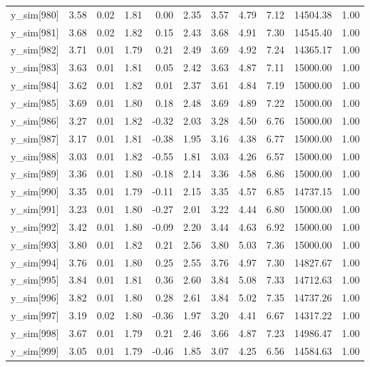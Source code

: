 \begin{table}[ht]
\begin{tabular}{rrrrrrrrrrr}
  y\_sim[980] & 3.58 & 0.02 & 1.81 & 0.00 & 2.35 & 3.57 & 4.79 & 7.12 & 14504.38 & 1.00 \\ 
  y\_sim[981] & 3.68 & 0.02 & 1.82 & 0.15 & 2.43 & 3.68 & 4.91 & 7.30 & 14545.40 & 1.00 \\ 
  y\_sim[982] & 3.71 & 0.01 & 1.79 & 0.21 & 2.49 & 3.69 & 4.92 & 7.24 & 14365.17 & 1.00 \\ 
  y\_sim[983] & 3.63 & 0.01 & 1.81 & 0.05 & 2.42 & 3.63 & 4.87 & 7.11 & 15000.00 & 1.00 \\ 
  y\_sim[984] & 3.62 & 0.01 & 1.82 & 0.01 & 2.37 & 3.61 & 4.84 & 7.19 & 15000.00 & 1.00 \\ 
  y\_sim[985] & 3.69 & 0.01 & 1.80 & 0.18 & 2.48 & 3.69 & 4.89 & 7.22 & 15000.00 & 1.00 \\ 
  y\_sim[986] & 3.27 & 0.01 & 1.82 & -0.32 & 2.03 & 3.28 & 4.50 & 6.76 & 15000.00 & 1.00 \\ 
  y\_sim[987] & 3.17 & 0.01 & 1.81 & -0.38 & 1.95 & 3.16 & 4.38 & 6.77 & 15000.00 & 1.00 \\ 
  y\_sim[988] & 3.03 & 0.01 & 1.82 & -0.55 & 1.81 & 3.03 & 4.26 & 6.57 & 15000.00 & 1.00 \\ 
  y\_sim[989] & 3.36 & 0.01 & 1.80 & -0.18 & 2.14 & 3.36 & 4.58 & 6.86 & 15000.00 & 1.00 \\ 
  y\_sim[990] & 3.35 & 0.01 & 1.79 & -0.11 & 2.15 & 3.35 & 4.57 & 6.85 & 14737.15 & 1.00 \\ 
  y\_sim[991] & 3.23 & 0.01 & 1.80 & -0.27 & 2.01 & 3.22 & 4.44 & 6.80 & 15000.00 & 1.00 \\ 
  y\_sim[992] & 3.42 & 0.01 & 1.80 & -0.09 & 2.20 & 3.44 & 4.63 & 6.92 & 15000.00 & 1.00 \\ 
  y\_sim[993] & 3.80 & 0.01 & 1.82 & 0.21 & 2.56 & 3.80 & 5.03 & 7.36 & 15000.00 & 1.00 \\ 
  y\_sim[994] & 3.76 & 0.01 & 1.80 & 0.25 & 2.55 & 3.76 & 4.97 & 7.30 & 14827.67 & 1.00 \\ 
  y\_sim[995] & 3.84 & 0.01 & 1.81 & 0.36 & 2.60 & 3.84 & 5.08 & 7.33 & 14712.63 & 1.00 \\ 
  y\_sim[996] & 3.82 & 0.01 & 1.80 & 0.28 & 2.61 & 3.84 & 5.02 & 7.35 & 14737.26 & 1.00 \\ 
  y\_sim[997] & 3.19 & 0.02 & 1.80 & -0.36 & 1.97 & 3.20 & 4.41 & 6.67 & 14317.22 & 1.00 \\ 
  y\_sim[998] & 3.67 & 0.01 & 1.79 & 0.21 & 2.46 & 3.66 & 4.87 & 7.23 & 14986.47 & 1.00 \\ 
  y\_sim[999] & 3.05 & 0.01 & 1.79 & -0.46 & 1.85 & 3.07 & 4.25 & 6.56 & 14584.63 & 1.00 \\ 

\end{tabular}
\end{table}

